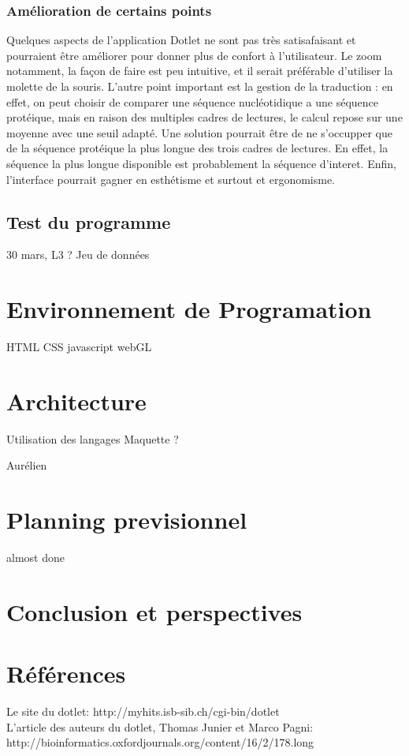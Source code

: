 \documentclass{report}
\begin{document}
\subsection{Amélioration de certains points}
Quelques aspects de l'application Dotlet ne sont pas très satisafaisant et pourraient être améliorer pour donner plus de confort à l'utilisateur. Le zoom notamment, la façon de faire est peu intuitive, et il serait préférable d'utiliser la molette de la souris. L'autre point important est la gestion de la traduction : en effet, on peut choisir de comparer une séquence nucléotidique a une séquence protéique, mais en raison des multiples cadres de lectures, le calcul repose sur une moyenne avec une seuil adapté. Une solution pourrait être de ne s'occupper que de la séquence protéique la plus longue des trois cadres de lectures. En effet, la séquence la plus longue disponible est probablement la séquence d'interet. Enfin, l'interface pourrait gagner en esthétisme et surtout et ergonomisme.

\section{Test du programme}

30 mars, L3 ?
Jeu de données

\chapter{Environnement de Programation}
HTML
CSS
javascript
webGL


\chapter{Architecture}
Utilisation des langages
Maquette ?

Aurélien


\chapter{Planning previsionnel}
almost done



\chapter*{Conclusion et perspectives}


\chapter*{Références}
Le site du dotlet: http://myhits.isb-sib.ch/cgi-bin/dotlet\\
L'article des auteurs du dotlet, Thomas Junier et Marco Pagni: http://bioinformatics.oxfordjournals.org/content/16/2/178.long\\
\end{document}
